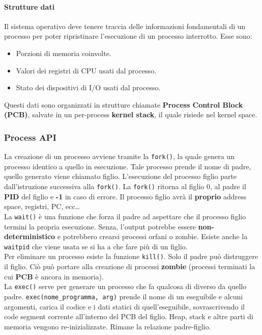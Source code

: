 \documentclass[12pt, letterpaper]{article}
\begin{document}
				\paragraph{Strutture dati} Il sistema operativo deve tenere traccia delle informazioni fondamentali di un processo per poter ripristinare l'esecuzione di un processo interrotto. Esse sono: 
					\begin{itemize}
						\item Porzioni di memoria coinvolte.
						\item Valori dei registri di CPU usati dal processo.
						\item Stato dei dispositivi di I/O usati dal processo.
					\end{itemize}
					Questi dati sono organizzati in strutture chiamate \textbf{Process Control Block (PCB)}, salvate in un per-process \textbf{kernel stack}, il quale risiede nel kernel space.
					
			\subsubsection{Process API}
				
				La creazione di un processo avviene tramite la \texttt{fork()}, la quale genera un processo identico a quello in esecuzione. Tale processo prende il nome di padre, quello generato viene chiamato figlio. L'esecuzione del processo figlio parte dall'istruzione successiva alla \texttt{fork()}. La \texttt{fork()} ritorna al figlio 0, al padre il \textbf{PID} del figlio e \textbf{-1} in caso di errore. Il processo figlio avrà il \textbf{proprio} address space, registri, PC, ecc\dots   \\
				
				La \texttt{wait()} è una funzione che forza il padre ad aspettare che il processo figlio termini la propria esecuzione. Senza, l'output potrebbe essere \textbf{non-deterministico} e potrebbero crearsi processi orfani o zombie. Esiste anche la \texttt{waitpid} che viene usata se si ha a che fare più di un figlio.\\
				
				Per eliminare un processo esiste la funzione \texttt{kill()}. Solo il padre può distruggere il figlio. Ciò può portare alla creazione di processi \textbf{zombie} (processi terminati la cui \textbf{PCB} è ancora in memoria). \\
				
				La \texttt{exec()} serve per generare un processo che fa qualcosa di diverso da quello padre. \texttt{exec(nome\_programma, arg)} prende il nome di un eseguibile e alcuni argomenti, carica il codice e i dati statici di quell'eseguibile, sovrascrivendo il code segment corrente all'interno del PCB del figlio. Heap, stack e altre parti di memoria vengono re-inizializzate. Rimane la relazione padre-figlio.
				
\end{document}
